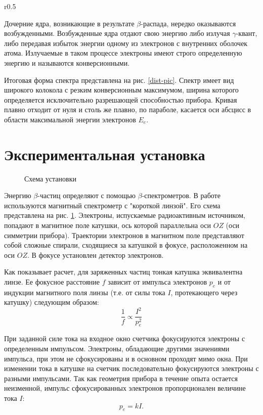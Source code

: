 \documentclass{physlab}
\begin{document}
\begin{wrapfigure}{r}{0.5\linewidth} \label{dist-pic} 
\vspace{-5ex}  
\caption{Форма спектра $\beta$-частиц}
\end{wrapfigure}

Дочерние ядра, возникающие в результате $\beta$-распада, нередко оказываются возбужденными. Возбужденные ядра отдают свою энергию либо излучая $\gamma$-квант, либо передавая избыток энергии одному из электронов с внутренних оболочек атома. Излучаемые в таком процессе электроны имеют строго определенную энергию и называются конверсионными.

Итоговая форма спектра представлена на рис. \ref{dist-pic}. 
Спектр имеет вид широкого колокола с резким конверсионным максимумом, ширина которого определяется исключительно разрешающей способностью прибора. Кривая плавно отходит от нуля и столь же плавно, по параболе, касается оси абсцисс в области максимальной энергии электронов $E_e$. 

\section{Экспериментальная установка}

\begin{figure}[ht!] \label{scheme} 
\caption{Схема установки}
\end{figure}

Энергию $\beta$-частиц определяют с помощью $\beta$-спектрометров. В работе используются магнитный спектрометр с "короткой линзой". Его схема представлена на рис. \ref{scheme}. Электроны, испускаемые радиоактивным источником, попадают в магнитное поле катушки, ось которой параллельна оси $OZ$ (оси симметрии прибора). Траектории электронов в магнитном поле представляют собой сложные спирали, сходящиеся за катушкой в фокусе, расположенном на оси $OZ$. В фокусе установлен детектор электронов.

Как показывает расчет, для заряженных частиц тонкая катушка эквивалентна линзе. Ее фокусное расстояние $f$ зависит от импульса электронов $p_e$ и от индукции магнитного поля линзы (т.е. от силы тока $I$, протекающего через катушку) следующим образом:
\begin{equation} \label{focus}
\frac{1}{f} \propto \frac{I^2}{p_e^2}
\end{equation}

При заданной силе тока на входное окно счетчика фокусируются электроны с определенным импульсом. Электроны, обладающие другими значениями импульса, при этом не сфокусированы и в основном проходят мимо окна. При изменении тока в катушке на счетчик последовательно фокусируются электроны с разными импульсами. Так как геометрия прибора в течение опыта остается неизменной, импульс сфокусированных электронов пропорционален величине тока $I$:
\begin{equation}
p_e = kI.
\end{equation}
\end{document}
